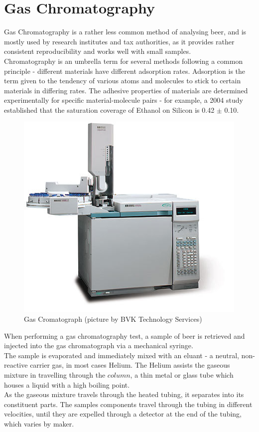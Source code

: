 \documentclass[twoside]{ctuthesis}
\theoremstyle{plain}
\theoremstyle{definition}
\theoremstyle{note}
\begin{document}
\section{Gas Chromatography}
Gas Chromatography is a rather less common method of analysing beer, and is mostly used by research institutes and tax authorities, as it provides rather consistent reproducibility and works well with small samples.\\
Chromatography is an umbrella term for several methods following a common principle - different materials have different adsorption rates. Adsorption is the term given to the tendency of various atoms and molecules to stick to certain materials in differing rates. The adhesive properties of materials are determined experimentally for specific material-molecule pairs - for example, a 2004 study established that the saturation coverage of Ethanol on Silicon is 0.42 $\pm$ 0.10.\cite{Ehtnaol_adsorption,Gas_Chromatography_beer}\\

\begin{figure}[H]
	\centering
	\includegraphics[scale = 0.4]{refurbished-gas_chromatograph}
	\caption{Gas Cromatograph (picture by BVK Technology Services)}
\end{figure}

When performing a gas chromatography test, a sample of beer is retrieved and injected into the gas chromatograph via a mechanical syringe. \\
The sample is evaporated and immediately mixed with an eluant - a neutral, non-reactive carrier gas, in most cases Helium. The Helium assists the gaseous mixture in travelling through the $column$, a thin metal or glass tube which houses a liquid with a high boiling point. \\
As the gaseous mixture travels through the heated tubing, it separates into its constituent parts. The samples components travel through the tubing in different velocities, until they are expelled through a detector at the end of the tubing, which varies by maker.
\end{document}
